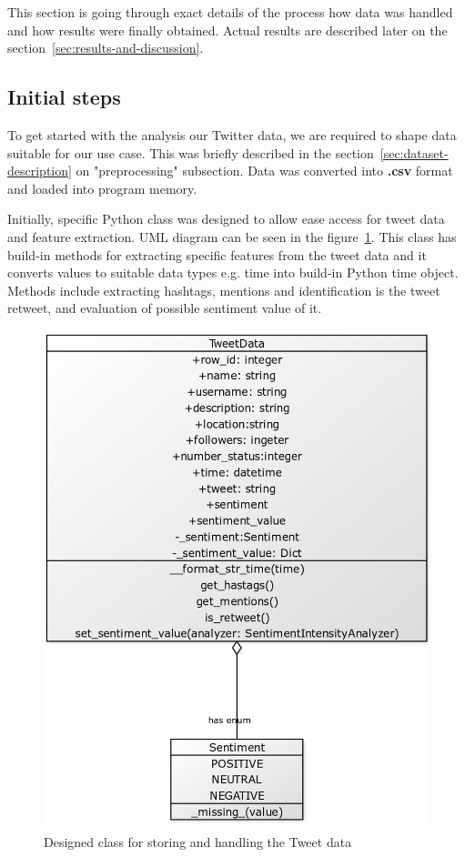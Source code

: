 This section is going through exact details of the process how data was handled and how results were finally obtained.
Actual results are described later on the section~\ref{sec:results-and-discussion}.


\subsection{Initial steps}

To get started with the analysis our Twitter data, we are required to shape data suitable for our use case.
This was briefly described in the section~\ref{sec:dataset-description} on "preprocessing" subsection.
Data was converted into \textbf{.csv} format and loaded into program memory.

Initially, specific Python class was designed to allow ease access for tweet data and feature extraction.
UML diagram can be seen in the figure~\ref{fig:tweetdata_design}.
This class has build-in methods for extracting specific features from the tweet data and it converts values to suitable data types e.g. time into build-in Python time object.
Methods include extracting hashtags, mentions and identification is the tweet retweet, and evaluation of possible sentiment value of it.

\begin{figure}
    \includegraphics[scale=0.3]{figures/uml_tweetdata}
    \caption{Designed class for storing and handling the Tweet data}
    \label{fig:tweetdata_design}
\end{figure}

